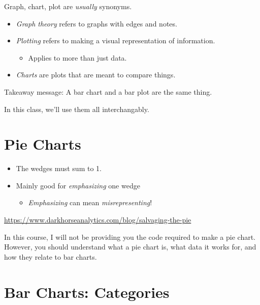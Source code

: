 \documentclass[
  letterpaper,
  DIV=11,
  numbers=noendperiod]{scrreprt}
\providecommand{\tightlist}{%
  \setlength{\itemsep}{0pt}\setlength{\parskip}{0pt}}\usepackage{longtable,booktabs,array}
\begin{document}
Graph, chart, plot are \emph{usually} synonyms.

\begin{itemize}
\tightlist
\item
  \emph{Graph theory} refers to graphs with edges and notes.
\item
  \emph{Plotting} refers to making a visual representation of
  information.

  \begin{itemize}
  \tightlist
  \item
    Applies to more than just data.
  \end{itemize}
\item
  \emph{Charts} are plots that are meant to compare things.
\end{itemize}

\pspace

Takeaway message: A bar chart and a bar plot are the same thing.

In this class, we'll use them all interchangably.

\hypertarget{pie-charts}{%
\section{Pie Charts}\label{pie-charts}}

\begin{itemize}
\tightlist
\item
  The wedges must sum to 1.
\item
  Mainly good for \emph{emphasizing} one wedge

  \begin{itemize}
  \tightlist
  \item
    \emph{Emphasizing} can mean \emph{misrepresenting}!
  \end{itemize}
\end{itemize}

\pspace

\url{https://www.darkhorseanalytics.com/blog/salvaging-the-pie}

In this course, I will not be providing you the code required to make a
pie chart. However, you should understand what a pie chart is, what data
it works for, and how they relate to bar charts.

\hypertarget{bar-charts-categories}{%
\section{Bar Charts: Categories}\label{bar-charts-categories}}
\end{document}
